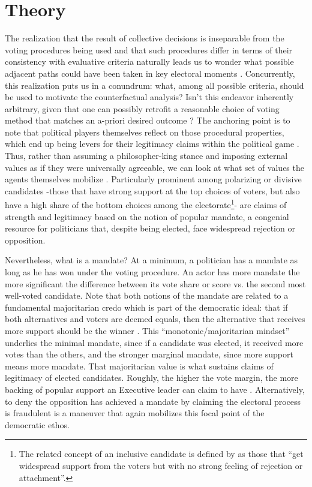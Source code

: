 \documentclass[hidelinks,11pt]{article} \usepackage[utf8]{inputenc}
\begin{document}
\section{Theory}

The realization that the result of collective decisions is inseparable from the
voting procedures being used and that such procedures differ in terms of their
consistency with evaluative criteria naturally leads us to wonder what possible
adjacent paths could have been taken in key electoral moments
\parencite{tabarrok1999would, kaminski1999communism, ostrom1986agenda}.
Concurrently, this realization puts us in a conundrum: what, among all possible
criteria, should be used to motivate the counterfactual analysis? Isn't this
endeavor inherently arbitrary, given that one can possibly retrofit a reasonable
choice of voting method that matches an a-priori desired outcome
\parencite{riker1982liberalism}? The anchoring point is to note that political players themselves reflect on those procedural properties, which end up being
levers for their legitimacy claims within the political game
\parencite{mclean02_william_h, ostrom2009understanding}. Thus, rather than
assuming a philosopher-king stance and imposing external values as if they were
universally agreeable, we can look at what set of values the agents themselves
mobilize \parencite{binmore2005natural}. Particularly prominent among polarizing
or divisive candidates -those that have strong support at the top choices of
voters, but also have a high share of the bottom choices among the
electorate\footnote{The related concept of an inclusive candidate is
  defined by \textcite[p.6]{igersheim22_compar_votin_method} as those that ``get
  widespread support from the voters but with no strong feeling of rejection or
  attachment''.}- are claims of strength and legitimacy based on the notion of
popular mandate, a congenial resource for politicians that, despite being
elected, face widespread rejection or opposition.


Nevertheless, what is a mandate? At a minimum, a politician has a mandate as
long as he has won under the voting procedure. An actor has more mandate the
more significant the difference between its vote share or score vs. the second
most well-voted candidate. Note that both notions of the mandate are related to
a fundamental majoritarian credo which is part of the democratic ideal: that if
both alternatives and voters are deemed equals, then the alternative that
receives more support should be the winner \parencite{dahl1989democracy}. This
``monotonic/majoritarian mindset'' underlies the minimal mandate, since if a
candidate was elected, it received more votes than the others, and the stronger
marginal mandate, since more support means more mandate. That majoritarian value
is what sustains claims of legitimacy of elected candidates. Roughly, the higher
the vote margin, the more backing of popular support an Executive leader can
claim to have \parencite{grossman2022majoritarian}. Alternatively, to deny the
opposition has achieved a mandate by claiming the electoral process is
fraudulent is a maneuver that again mobilizes this focal point of the democratic
ethos.
\end{document}
